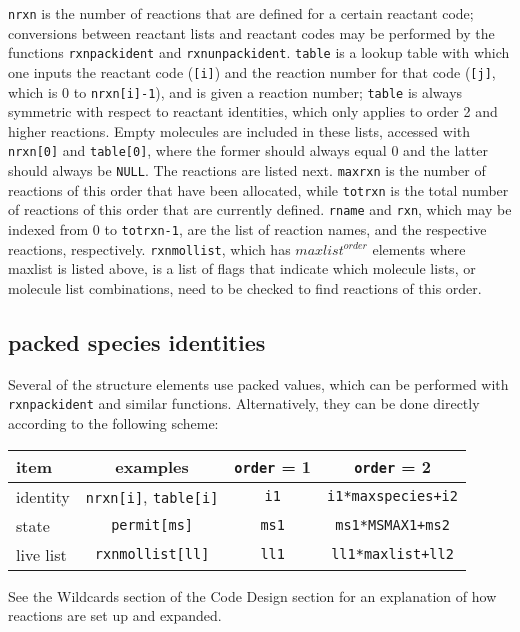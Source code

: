 \documentclass {book}
\begin{document}
\texttt{nrxn} is the number of reactions that are defined for a certain reactant code; conversions between reactant lists and reactant codes may be performed by the functions \texttt{rxnpackident} and \texttt{rxnunpackident}. \texttt{table} is a lookup table with which one inputs the reactant code (\texttt{[i]}) and the reaction number for that code (\texttt{[j]}, which is 0 to \texttt{nrxn[i]-1}), and is given a reaction number; \texttt{table} is always symmetric with respect to reactant identities, which only applies to order 2 and higher reactions. Empty molecules are included in these lists, accessed with \texttt{nrxn[0]} and \texttt{table[0]}, where the former should always equal 0 and the latter should always be \texttt{NULL}. The reactions are listed next. \texttt{maxrxn} is the number of reactions of this order that have been allocated, while \texttt{totrxn} is the total number of reactions of this order that are currently defined. \texttt{rname} and \texttt{rxn}, which may be indexed from 0 to \texttt{totrxn-1}, are the list of reaction names, and the respective reactions, respectively. \texttt{rxnmollist}, which has $maxlist^{order}$ elements where maxlist is listed above, is a list of flags that indicate which molecule lists, or molecule list combinations, need to be checked to find reactions of this order.

\subsection*{packed species identities}

Several of the structure elements use packed values, which can be performed with \texttt{rxnpackident} and similar functions. Alternatively, they can be done directly according to the following scheme:

\begin{longtable}[c]{lccc}
item & examples & \texttt{order} = 1 & \texttt{order} = 2\\
\hline
identity & \texttt{nrxn[i]}, \texttt{table[i]} & \texttt{i1} & \texttt{i1*maxspecies+i2}\\
state & \texttt{permit[ms]} & \texttt{ms1} & \texttt{ms1*MSMAX1+ms2}\\
live list & \texttt{rxnmollist[ll]} & \texttt{ll1} & \texttt{ll1*maxlist+ll2}\\
\end{longtable}

See the Wildcards section of the Code Design section for an explanation of how reactions are set up and expanded.
\end{document}
